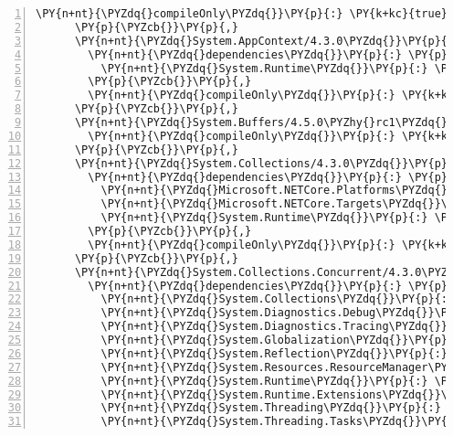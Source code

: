 \begin{Verbatim}[commandchars=\\\{\},numbers=left,firstnumber=1,stepnumber=1,numberblanklines=0]
        \PY{n+nt}{\PYZdq{}compileOnly\PYZdq{}}\PY{p}{:} \PY{k+kc}{true}
      \PY{p}{\PYZcb{}}\PY{p}{,}
      \PY{n+nt}{\PYZdq{}System.AppContext/4.3.0\PYZdq{}}\PY{p}{:} \PY{p}{\PYZob{}}
        \PY{n+nt}{\PYZdq{}dependencies\PYZdq{}}\PY{p}{:} \PY{p}{\PYZob{}}
          \PY{n+nt}{\PYZdq{}System.Runtime\PYZdq{}}\PY{p}{:} \PY{l+s+s2}{\PYZdq{}4.3.0\PYZdq{}}
        \PY{p}{\PYZcb{}}\PY{p}{,}
        \PY{n+nt}{\PYZdq{}compileOnly\PYZdq{}}\PY{p}{:} \PY{k+kc}{true}
      \PY{p}{\PYZcb{}}\PY{p}{,}
      \PY{n+nt}{\PYZdq{}System.Buffers/4.5.0\PYZhy{}rc1\PYZdq{}}\PY{p}{:} \PY{p}{\PYZob{}}
        \PY{n+nt}{\PYZdq{}compileOnly\PYZdq{}}\PY{p}{:} \PY{k+kc}{true}
      \PY{p}{\PYZcb{}}\PY{p}{,}
      \PY{n+nt}{\PYZdq{}System.Collections/4.3.0\PYZdq{}}\PY{p}{:} \PY{p}{\PYZob{}}
        \PY{n+nt}{\PYZdq{}dependencies\PYZdq{}}\PY{p}{:} \PY{p}{\PYZob{}}
          \PY{n+nt}{\PYZdq{}Microsoft.NETCore.Platforms\PYZdq{}}\PY{p}{:} \PY{l+s+s2}{\PYZdq{}2.1.0\PYZhy{}rc1\PYZdq{}}\PY{p}{,}
          \PY{n+nt}{\PYZdq{}Microsoft.NETCore.Targets\PYZdq{}}\PY{p}{:} \PY{l+s+s2}{\PYZdq{}2.1.0\PYZhy{}rc1\PYZdq{}}\PY{p}{,}
          \PY{n+nt}{\PYZdq{}System.Runtime\PYZdq{}}\PY{p}{:} \PY{l+s+s2}{\PYZdq{}4.3.0\PYZdq{}}
        \PY{p}{\PYZcb{}}\PY{p}{,}
        \PY{n+nt}{\PYZdq{}compileOnly\PYZdq{}}\PY{p}{:} \PY{k+kc}{true}
      \PY{p}{\PYZcb{}}\PY{p}{,}
      \PY{n+nt}{\PYZdq{}System.Collections.Concurrent/4.3.0\PYZdq{}}\PY{p}{:} \PY{p}{\PYZob{}}
        \PY{n+nt}{\PYZdq{}dependencies\PYZdq{}}\PY{p}{:} \PY{p}{\PYZob{}}
          \PY{n+nt}{\PYZdq{}System.Collections\PYZdq{}}\PY{p}{:} \PY{l+s+s2}{\PYZdq{}4.3.0\PYZdq{}}\PY{p}{,}
          \PY{n+nt}{\PYZdq{}System.Diagnostics.Debug\PYZdq{}}\PY{p}{:} \PY{l+s+s2}{\PYZdq{}4.3.0\PYZdq{}}\PY{p}{,}
          \PY{n+nt}{\PYZdq{}System.Diagnostics.Tracing\PYZdq{}}\PY{p}{:} \PY{l+s+s2}{\PYZdq{}4.3.0\PYZdq{}}\PY{p}{,}
          \PY{n+nt}{\PYZdq{}System.Globalization\PYZdq{}}\PY{p}{:} \PY{l+s+s2}{\PYZdq{}4.3.0\PYZdq{}}\PY{p}{,}
          \PY{n+nt}{\PYZdq{}System.Reflection\PYZdq{}}\PY{p}{:} \PY{l+s+s2}{\PYZdq{}4.3.0\PYZdq{}}\PY{p}{,}
          \PY{n+nt}{\PYZdq{}System.Resources.ResourceManager\PYZdq{}}\PY{p}{:} \PY{l+s+s2}{\PYZdq{}4.3.0\PYZdq{}}\PY{p}{,}
          \PY{n+nt}{\PYZdq{}System.Runtime\PYZdq{}}\PY{p}{:} \PY{l+s+s2}{\PYZdq{}4.3.0\PYZdq{}}\PY{p}{,}
          \PY{n+nt}{\PYZdq{}System.Runtime.Extensions\PYZdq{}}\PY{p}{:} \PY{l+s+s2}{\PYZdq{}4.3.0\PYZdq{}}\PY{p}{,}
          \PY{n+nt}{\PYZdq{}System.Threading\PYZdq{}}\PY{p}{:} \PY{l+s+s2}{\PYZdq{}4.3.0\PYZdq{}}\PY{p}{,}
          \PY{n+nt}{\PYZdq{}System.Threading.Tasks\PYZdq{}}\PY{p}{:} \PY{l+s+s2}{\PYZdq{}4.3.0\PYZdq{}}

\end{Verbatim}
